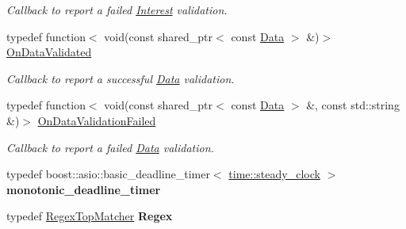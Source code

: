 \begin{DoxyCompactItemize}
\begin{DoxyCompactList}\small\item\em Callback to report a failed \hyperlink{classndn_1_1Interest}{Interest} validation. \end{DoxyCompactList}\item 
typedef function$<$ void(const shared\+\_\+ptr$<$ const \hyperlink{classndn_1_1Data}{Data} $>$ \&)$>$ \hyperlink{namespacendn_aeaa15e849fd25636f59ca61acb64e532}{On\+Data\+Validated}\hypertarget{namespacendn_aeaa15e849fd25636f59ca61acb64e532}{}\label{namespacendn_aeaa15e849fd25636f59ca61acb64e532}

\begin{DoxyCompactList}\small\item\em Callback to report a successful \hyperlink{classndn_1_1Data}{Data} validation. \end{DoxyCompactList}\item 
typedef function$<$ void(const shared\+\_\+ptr$<$ const \hyperlink{classndn_1_1Data}{Data} $>$ \&, const std\+::string \&)$>$ \hyperlink{namespacendn_ae3c60219d74ba747e368708d93782760}{On\+Data\+Validation\+Failed}\hypertarget{namespacendn_ae3c60219d74ba747e368708d93782760}{}\label{namespacendn_ae3c60219d74ba747e368708d93782760}

\begin{DoxyCompactList}\small\item\em Callback to report a failed \hyperlink{classndn_1_1Data}{Data} validation. \end{DoxyCompactList}\item 
typedef boost\+::asio\+::basic\+\_\+deadline\+\_\+timer$<$ \hyperlink{classndn_1_1time_1_1steady__clock}{time\+::steady\+\_\+clock} $>$ {\bfseries monotonic\+\_\+deadline\+\_\+timer}\hypertarget{namespacendn_aaf12548b01bbc90ddbd2275e657c4347}{}\label{namespacendn_aaf12548b01bbc90ddbd2275e657c4347}

\item 
typedef \hyperlink{classndn_1_1RegexTopMatcher}{Regex\+Top\+Matcher} {\bfseries Regex}\hypertarget{namespacendn_ad0d347ebd0eae6f95c0ba654eee68031}{}\label{namespacendn_ad0d347ebd0eae6f95c0ba654eee68031}

\end{DoxyCompactItemize}
